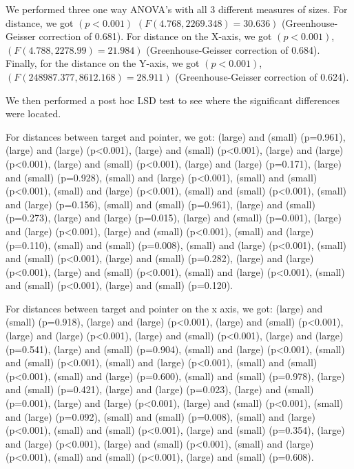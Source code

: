We performed three one way ANOVA's with all 3 different measures of sizes.
For distance, we got $(p<0.001)$ $(F(4.768, 2269.348) = 30.636)$ (Greenhouse-Geisser correction of 0.681).
For distance on the X-axis, we got $(p<0.001)$, $(F(4.788,2278.99) = 21.984)$ (Greenhouse-Geisser correction of 0.684).
Finally, for the distance on the Y-axis, we got $(p<0.001)$, $(F(248987.377, 8612.168)=28.911)$ (Greenhouse-Geisser correction of 0.624).

We then performed a post hoc LSD test to see where the significant differences were located. 

For distances between target and pointer, we got: 
\pinch(large) and \pinch(small) (p=0.961), \pinch(large) and \swipe(large) (p<0.001), \pinch(large) and \swipe(small) (p<0.001), \pinch(large) and \throw(large) (p<0.001), \pinch(large) and \throw(small) (p<0.001), \pinch(large) and \tilt(large) (p=0.171), \pinch(large) and \tilt(small) (p=0.928), \pinch(small) and \swipe(large) (p<0.001), \pinch(small) and \swipe(small) (p<0.001), \pinch(small) and \throw(large) (p<0.001), \pinch(small) and \throw(small) (p<0.001), \pinch(small) and \tilt(large) (p=0.156), \pinch(small) and \tilt(small) (p=0.961), \swipe(large) and \swipe(small) (p=0.273), \swipe(large) and \throw(large) (p=0.015), \swipe(large) and \throw(small) (p=0.001), \swipe(large) and \tilt(large) (p<0.001), \swipe(large) and \tilt(small) (p<0.001), \swipe(small) and \throw(large) (p=0.110), \swipe(small) and \throw(small) (p=0.008), \swipe(small) and \tilt(large) (p<0.001), \swipe(small) and \tilt(small) (p<0.001), \throw(large) and \throw(small) (p=0.282), \throw(large) and \tilt(large) (p<0.001), \throw(large) and \tilt(small) (p<0.001), \throw(small) and \tilt(large) (p<0.001), \throw(small) and \tilt(small) (p<0.001), \tilt(large) and \tilt(small) (p=0.120).

For distances between target and pointer on the x axis, we got: 
\pinch(large) and \pinch(small) (p=0.918), \pinch(large) and \swipe(large) (p<0.001), \pinch(large) and \swipe(small) (p<0.001), \pinch(large) and \throw(large) (p<0.001), \pinch(large) and \throw(small) (p<0.001), \pinch(large) and \tilt(large) (p=0.541), \pinch(large) and \tilt(small) (p=0.904), \pinch(small) and \swipe(large) (p<0.001), \pinch(small) and \swipe(small) (p<0.001), \pinch(small) and \throw(large) (p<0.001), \pinch(small) and \throw(small) (p<0.001), \pinch(small) and \tilt(large) (p=0.600), \pinch(small) and \tilt(small) (p=0.978), \swipe(large) and \swipe(small) (p=0.421), \swipe(large) and \throw(large) (p=0.023), \swipe(large) and \throw(small) (p=0.001), \swipe(large) and \tilt(large) (p<0.001), \swipe(large) and \tilt(small) (p<0.001), \swipe(small) and \throw(large) (p=0.092), \swipe(small) and \throw(small) (p=0.008), \swipe(small) and \tilt(large) (p<0.001), \swipe(small) and \tilt(small) (p<0.001), \throw(large) and \throw(small) (p=0.354), \throw(large) and \tilt(large) (p<0.001), \throw(large) and \tilt(small) (p<0.001), \throw(small) and \tilt(large) (p<0.001), \throw(small) and \tilt(small) (p<0.001), \tilt(large) and \tilt(small) (p=0.608).

